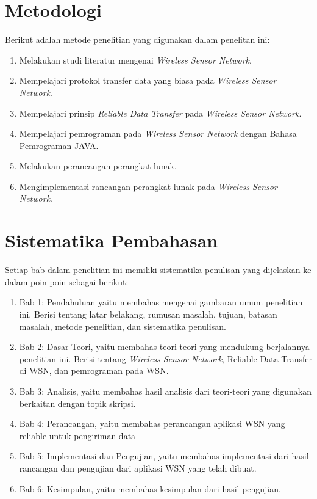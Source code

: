 \section{Metodologi}
\label{sec:metlit}
Berikut adalah metode penelitian yang digunakan dalam penelitan ini:
\begin{enumerate}
	\item Melakukan studi literatur mengenai \textit{Wireless Sensor Network}.
	\item Mempelajari protokol transfer data yang biasa pada \textit{Wireless Sensor Network}.
	\item Mempelajari prinsip \textit{Reliable Data Transfer} pada \textit{Wireless Sensor Network}.	
	\item Mempelajari pemrograman pada \textit{Wireless Sensor Network} dengan Bahasa Pemrograman JAVA.
	\item Melakukan perancangan perangkat lunak.
	\item Mengimplementasi rancangan perangkat lunak pada \textit{Wireless Sensor Network}.
\end{enumerate}


\section{Sistematika Pembahasan}
\label{sec:sispem}
Setiap bab dalam penelitian ini memiliki sistematika penulisan yang dijelaskan ke dalam poin-poin sebagai berikut:

\begin{enumerate}
	\item Bab 1: Pendahuluan yaitu membahas mengenai gambaran umum penelitian ini. Berisi tentang latar belakang, rumusan masalah, tujuan, batasan masalah, metode penelitian, dan sistematika penulisan.
	\item Bab 2: Dasar Teori, yaitu membahas teori-teori yang mendukung berjalannya penelitian ini. Berisi tentang \textit{Wireless Sensor Network}, Reliable Data Transfer di WSN, dan pemrograman pada WSN.
	\item Bab 3: Analisis, yaitu membahas hasil analisis dari teori-teori yang digunakan berkaitan dengan topik skripsi.
	\item Bab 4: Perancangan, yaitu membahas perancangan aplikasi WSN yang reliable untuk pengiriman data
	\item Bab 5: Implementasi dan Pengujian, yaitu membahas implementasi dari hasil rancangan dan pengujian dari aplikasi WSN yang telah dibuat.
	\item Bab 6: Kesimpulan, yaitu membahas kesimpulan dari hasil pengujian.
\end{enumerate}
	